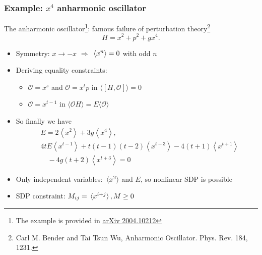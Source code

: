\documentclass{beamer}
\begin{document}
\begin{frame}
\frametitle{Example: $x^4$ anharmonic oscillator}

The anharmonic oscillator\footnote{The example is provided in \href{https://arxiv.org/abs/2004.10212}{arXiv 2004.10212}}: famous failure of perturbation theory\footnote{Carl M. Bender and Tai Tsun Wu, Anharmonic Oscillator. Phys. Rev. 184, 1231.}
\begin{equation}
    H = x^2 + p^2 + g x^4.
\end{equation}

\begin{itemize}
    \item Symmetry: $x \to -x$ $\Rightarrow$ $\expval*{x^n} = 0$ with odd $n$
    \item Deriving equality constraints:
    \begin{itemize}
        \item $\mathcal{O}=x^{s}$ and $\mathcal{O}=x^{t} p$ in $\langle[H, \mathcal{O}]\rangle=0$ 
        \item $\mathcal{O}=x^{t-1}$ in $\langle\mathcal{O} H\rangle=E\langle\mathcal{O}\rangle$
    \end{itemize}
    \item So finally we have
        \begin{equation}
            \begin{aligned}
                &E=2\left\langle x^{2}\right\rangle+3 g\left\langle x^{4}\right\rangle, \\
                &4 t E\left\langle x^{t-1}\right\rangle +t(t-1)(t-2)\left\langle x^{t-3}\right\rangle -4(t+1)\left\langle x^{t+1}\right\rangle \\
                &\quad -4 g(t+2)\left\langle x^{t+3}\right\rangle=0 
            \end{aligned}
        \end{equation}
    \item Only independent variables: $\expval*{x^2}$ and $E$, so nonlinear SDP is possible
    \item SDP constraint: $M_{ij} = \expval*{x^{i+j}}, M \geq 0$
\end{itemize}

\end{frame}
\end{document}
